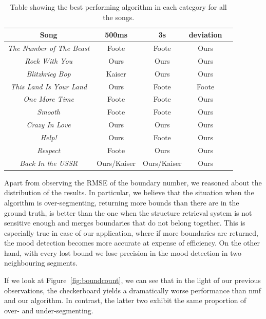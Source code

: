 \begin{table}
\begin{center}
\begin{tabular}{| c | c | c | c | c | } \hline 
Song  											& 	500ms 			&  3s						&  deviation	\\ \hline \hline
\textit{The Number of The Beast} 	&	Foote			& 	Foote  				&  Ours 			\\ \hline
\textit{Rock With You}						&	Ours				&  Ours			  		&  Ours			\\ \hline
\textit{Blitzkrieg Bop} 						&	Kaiser			&  Ours  				&  Ours 			\\ \hline
\textit{This Land Is Your Land} 		&	Ours				&  Foote			  	&  Foote 		\\ \hline
\textit{One More Time}					&	Foote			&  Foote    				&  Ours 			\\ \hline
\textit{Smooth}								&	Foote			&  Foote  				&  Ours 			\\ \hline
\textit{Crazy In Love}						&	Ours				&  Ours  				&  Ours  		\\ \hline
\textit{Help!}									&	Ours				&  Foote		   		&  Ours 			\\ \hline
\textit{Respect}								&	Foote			&  Ours  				&  Ours 			\\ \hline
\textit{Back In the USSR}				&	Ours/Kaiser	&  Ours/Kaiser 		&  Ours		    	\\ \hline

\end{tabular}
\caption{Table showing the best performing algorithm in each category for all the songs.}
\label{table:evalStructureRank}
\end{center}
\end{table}


Apart from observing the RMSE of the boundary number, we reasoned about the distribution of the results. In particular, we believe that the situation when the algorithm is over-segmenting, returning more bounds than there are in the ground truth, is better than the one when the structure retrieval system is not sensitive enough and merges boundaries that do not belong together. This is especially true in case of our application, where if more boundaries are returned, the mood detection becomes more accurate at expense of efficiency. On the other hand, with every lost bound we lose precision in the mood detection in two neighbouring segments.


If we look at Figure~\ref{fig:boundcount}, we can see that in the light of our previous observations, the checkerboard yields a dramatically worse performance than nmf and our algorithm. In contrast, the latter two exhibit the same proportion of over- and under-segmenting.


